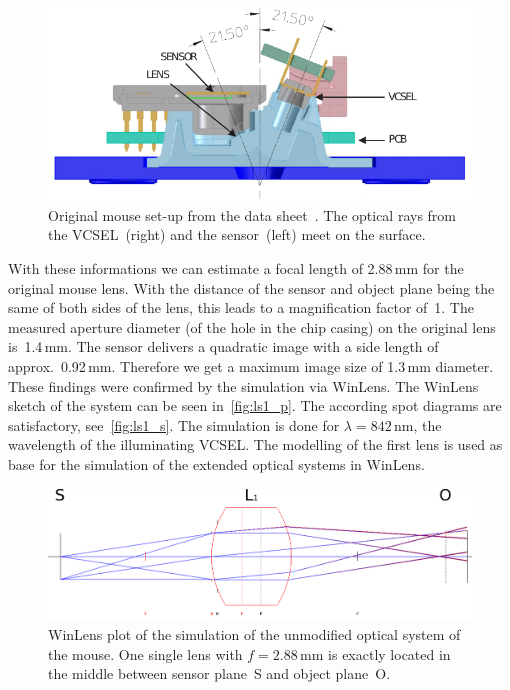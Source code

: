 \documentclass[12pt,a4paper]{article}
\begin{document}
\begin{figure}[htbp]
\begin{center}
\includegraphics[width=1\columnwidth]{figures/o_setup_datasheet}
\caption{\label{fig:o_setup_datasheet}
Original mouse set-up from the data sheet~\cite{adns}.
The optical rays from the VCSEL~(right) and the sensor~(left) meet on the surface.
}
\end{center}
\end{figure}

With these informations we can estimate a focal length of 2.88\,mm for the original mouse lens.
With the distance of the sensor and object plane being the same of both sides of the lens, this leads to a magnification factor of~1.
The measured aperture diameter (of the hole in the chip casing) on the original lens is~1.4\,mm.
The sensor delivers a quadratic image with a side length of approx.~0.92\,mm. 
Therefore we get a maximum image size of 1.3\,mm diameter.\\
These findings were confirmed by the simulation via WinLens.
The WinLens sketch of the system can be seen in~\autoref{fig:ls1_p}.
The according spot diagrams are satisfactory, see~\autoref{fig:ls1_s}.
The simulation is done for $\lambda = 842$\,nm, the wavelength of the illuminating VCSEL. 
The modelling of the first lens is used as base for the simulation of the extended optical systems in WinLens.

\begin{figure}[htbp]
\begin{center}
\includegraphics[width=1\columnwidth]{figures/lens_system_mouse.pdf}
\caption{\label{fig:ls1_p}
WinLens plot of the simulation of the unmodified optical system of the mouse.
One single lens with $f=2.88$\,mm is exactly located in the middle between sensor plane~S and object plane~O.
}
\end{center}
\end{figure}
\end{document}
